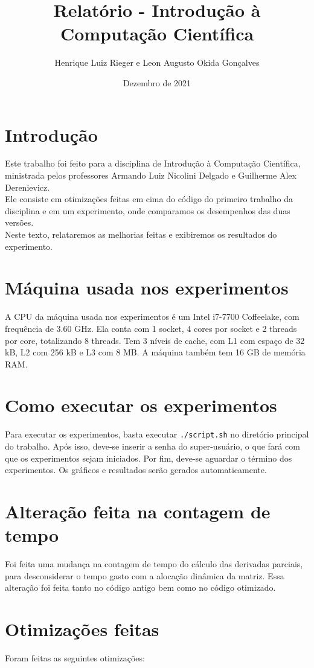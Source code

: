 \documentclass{article}
\title{Relatório - Introdução à Computação Científica}
\author{Henrique Luiz Rieger e Leon Augusto Okida Gonçalves}
\date{Dezembro de 2021}
\begin{document}
\maketitle

\newpage
\section{Introdução}
Este trabalho foi feito para a disciplina de Introdução à Computação Científica, ministrada pelos professores Armando Luiz Nicolini Delgado e Guilherme Alex Derenievicz.\\
Ele consiste em otimizações feitas em cima do código do primeiro trabalho da disciplina e em um experimento, onde comparamos os desempenhos das duas versões.\\
Neste texto, relataremos as melhorias feitas e exibiremos os resultados do experimento.

\newpage
\section{Máquina usada nos experimentos}
A CPU da máquina usada nos experimentos é um Intel i7-7700 Coffeelake, com frequência de 3.60 GHz.
Ela conta com 1 socket, 4 cores por socket e 2 threads por core, totalizando 8 threads.
Tem 3 níveis de cache, com L1 com espaço de 32 kB, L2 com 256 kB e L3 com 8 MB.
A máquina também tem 16 GB de memória RAM.

\newpage
\section{Como executar os experimentos}
Para executar os experimentos, basta executar \texttt{./script.sh} no diretório principal do trabalho.
Após isso, deve-se inserir a senha do super-usuário, o que fará com que os experimentos sejam iniciados.
Por fim, deve-se aguardar o término dos experimentos. Os gráficos e resultados serão gerados automaticamente.

\newpage
\section{Alteração feita na contagem de tempo}
Foi feita uma mudança na contagem de tempo do cálculo das derivadas parciais, para desconsiderar o tempo gasto com a alocação dinâmica da matriz.
Essa alteração foi feita tanto no código antigo bem como no código otimizado.

\newpage
\section{Otimizações feitas}
Foram feitas as seguintes otimizações:
\end{document}
